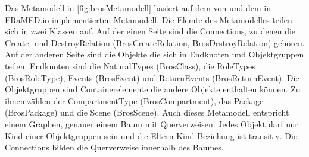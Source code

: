 Das Metamodell in \cref{fig:brosMetamodell} basiert auf dem von \cite{Schoen} und dem in FRaMED.io implementierten Metamodell.
Die Elemte des Metamodelles teilen sich in zwei Klassen auf.
Auf der einen Seite sind die Connections, zu denen die Create- und DestroyRelation (BrosCreateRelation, BrosDestroyRelation) gehören.
Auf der anderen Seite sind die Objekte die sich in Endknoten und Objektgruppen teilen.
Endknoten sind die NaturalTypes (BrosClass), die RoleTypes (BrosRoleType), Events (BrosEvent) und ReturnEvents (BrosReturnEvent).
Die Objektgruppen sind Containerelemente die andere Objekte enthalten können.
Zu ihnen zählen der CompartmentType (BrosCompartment), das Package (BrosPackage) und die Scene (BrosScene).
Auch dieses Metamodell entspricht einem Graphen, genauer einem Baum mit Querverweisen.
Jedes Objekt darf nur Kind einer Objektgruppen sein und die Eltern-Kind-Beziehung ist transitiv.
Die Connections bilden die Querverweise innerhalb des Baumes.
